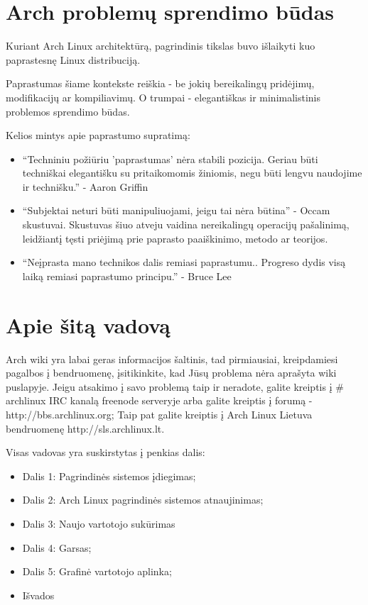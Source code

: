   \section{Arch problemų sprendimo būdas}
  
  Kuriant Arch Linux architektūrą, pagrindinis tikslas buvo išlaikyti
  kuo paprastesnę Linux distribuciją.

  Paprastumas šiame kontekste reiškia - be jokių bereikalingų
  pridėjimų, modifikacijų ar kompiliavimų. O trumpai - elegantiškas
  ir minimalistinis problemos sprendimo būdas.

  Kelios mintys apie paprastumo supratimą:
  \begin{itemize}
    \item ``Techniniu požiūriu 'paprastumas' nėra stabili
      pozicija. Geriau būti techniškai elegantišku su pritaikomomis
      žiniomis, negu būti lengvu naudojime ir technišku.'' - Aaron
      Griffin
    \item ``Subjektai neturi būti manipuliuojami, jeigu tai nėra
      būtina'' - Occam skustuvai. Skustuvas šiuo atveju vaidina
      nereikalingų operacijų pašalinimą, leidžiantį tęsti priėjimą prie
      paprasto paaiškinimo, metodo ar teorijos.
    \item ``Neįprasta mano technikos dalis remiasi
      paprastumu.. Progreso dydis visą laiką remiasi paprastumo principu.'' - Bruce Lee
  \end{itemize}

  \section{Apie šitą vadovą}

    Arch wiki yra labai geras informacijos šaltinis, tad pirmiausiai,
    kreipdamiesi pagalbos į bendruomenę, įsitikinkite, kad Jūsų problema nėra
    aprašyta wiki puslapyje. Jeigu atsakimo į savo problemą taip ir neradote, galite
    kreiptis į $\#$archlinux IRC kanalą freenode serveryje arba galite
    kreiptis į forumą - http://bbs.archlinux.org; Taip pat galite
    kreiptis į Arch Linux Lietuva bendruomenę http://sls.archlinux.lt.

    Visas vadovas yra suskirstytas į penkias dalis:
    \begin{itemize}
      \item Dalis 1: Pagrindinės sistemos įdiegimas;
      \item Dalis 2: Arch Linux pagrindinės sistemos atnaujinimas;
      \item Dalis 3: Naujo vartotojo sukūrimas
      \item Dalis 4: Garsas;
      \item Dalis 5: Grafinė vartotojo aplinka;
      \item Išvados
    \end{itemize}

